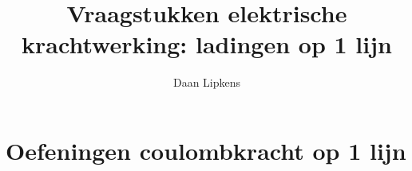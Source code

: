 \documentclass{ximera}
\title{Vraagstukken elektrische krachtwerking: ladingen op 1 lijn}
\author{Daan Lipkens}
\begin{document}
\begin{abstract}
\end{abstract}
\maketitle
\section{Oefeningen coulombkracht op 1 lijn}

\end{document}
